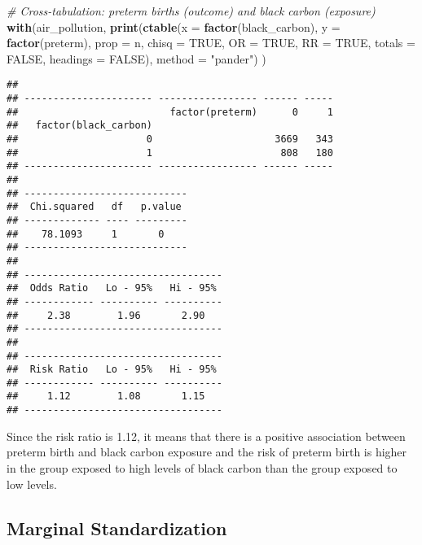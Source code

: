 \documentclass[
]{article}
\newenvironment{Shaded}{\begin{snugshade}}{\end{snugshade}}
\newcommand{\AttributeTok}[1]{\textcolor[rgb]{0.13,0.29,0.53}{#1}}
\newcommand{\CommentTok}[1]{\textcolor[rgb]{0.56,0.35,0.01}{\textit{#1}}}
\newcommand{\ConstantTok}[1]{\textcolor[rgb]{0.56,0.35,0.01}{#1}}
\newcommand{\FunctionTok}[1]{\textcolor[rgb]{0.13,0.29,0.53}{\textbf{#1}}}
\newcommand{\NormalTok}[1]{#1}
\newcommand{\StringTok}[1]{\textcolor[rgb]{0.31,0.60,0.02}{#1}}
\begin{document}
\begin{Shaded}
\begin{Highlighting}[]
\CommentTok{\# Cross{-}tabulation: preterm births (outcome) and black carbon (exposure)}
\FunctionTok{with}\NormalTok{(air\_pollution, }
     \FunctionTok{print}\NormalTok{(}\FunctionTok{ctable}\NormalTok{(}\AttributeTok{x =} \FunctionTok{factor}\NormalTok{(black\_carbon), }
                  \AttributeTok{y =} \FunctionTok{factor}\NormalTok{(preterm), }
                  \AttributeTok{prop     =} \StringTok{\textquotesingle{}n\textquotesingle{}}\NormalTok{,}
                  \AttributeTok{chisq =} \ConstantTok{TRUE}\NormalTok{,}
                  \AttributeTok{OR    =} \ConstantTok{TRUE}\NormalTok{,}
                  \AttributeTok{RR    =} \ConstantTok{TRUE}\NormalTok{,}
                  \AttributeTok{totals   =} \ConstantTok{FALSE}\NormalTok{, }
                  \AttributeTok{headings =} \ConstantTok{FALSE}\NormalTok{),}
            \AttributeTok{method =} \StringTok{"pander"}\NormalTok{)}
\NormalTok{)}
\end{Highlighting}
\end{Shaded}

\begin{verbatim}
## 
## ---------------------- ----------------- ------ -----
##                          factor(preterm)      0     1
##   factor(black_carbon)                               
##                      0                     3669   343
##                      1                      808   180
## ---------------------- ----------------- ------ -----
## 
## ----------------------------
##  Chi.squared   df   p.value 
## ------------- ---- ---------
##    78.1093     1       0    
## ----------------------------
## 
## ----------------------------------
##  Odds Ratio   Lo - 95%   Hi - 95% 
## ------------ ---------- ----------
##     2.38        1.96       2.90   
## ----------------------------------
## 
## ----------------------------------
##  Risk Ratio   Lo - 95%   Hi - 95% 
## ------------ ---------- ----------
##     1.12        1.08       1.15   
## ----------------------------------
\end{verbatim}

Since the risk ratio is 1.12, it means that there is a positive
association between preterm birth and black carbon exposure and the risk
of preterm birth is higher in the group exposed to high levels of black
carbon than the group exposed to low levels.

\subsection{\texorpdfstring{\textbf{Marginal
Standardization}}{Marginal Standardization}}\label{marginal-standardization}
\end{document}

